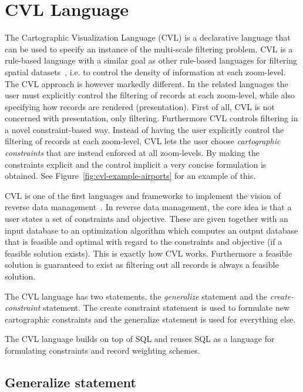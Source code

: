 \section{CVL Language}
\label{sec:cvl-language}
The Cartographic Visualization Language (CVL) is a declarative language that can be used to specify an instance of the multi-scale filtering problem. CVL is a rule-based language with a similar goal as other rule-based languages for filtering spatial datasets~\cite{sld,mapnik}, i.e. to control the density of information at each zoom-level. The CVL approach is however markedly different. In the related languages the user must explicitly control the filtering of records at each zoom-level, while also specifying how records are rendered (presentation). First of all, CVL is not concerned with presentation, only filtering. Furthermore CVL controls filtering in a novel constraint-based way. Instead of having the user explicitly control the filtering of records at each zoom-level, CVL lets the user choose \emph{cartographic constraints} that are instead enforced at all zoom-levels. By making the constraints explicit and the control implicit a very concise formulation is obtained. See Figure~\ref{fig:cvl-example-airports} for an example of this.

CVL is one of the first languages and frameworks to implement the vision of reverse data management~\cite{meliou2011reverse}. In reverse data management, the core idea is that a user states a set of constraints and objective. These are given together with an input database to an optimization algorithm which computes an output database that is feasible and optimal with regard to the constraints and objective (if a feasible solution exists). This is exactly how CVL works. Furthermore a feasible solution is guaranteed to exist as filtering out all records is always a feasible solution.

The CVL language has two statements, the \emph{generalize} statement and the \emph{create-constraint} statement. The create constraint statement is used to formulate new cartographic constraints and the generalize statement is used for everything else. 

The CVL language builds on top of SQL and reuses SQL as a language for formulating constraints and record weighting schemes.

\subsection{Generalize statement}
\label{sec:generalize-statement}

